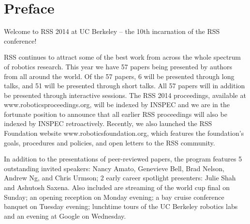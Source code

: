 
\chapter*{Preface}


                                                                     
                                             
\vspace{1cm}
\begingroup{}
\Large

Welcome to RSS 2014 at UC Berkeley – the 10th incarnation of the RSS conference! 

\vspace{1mm}

RSS continues to attract some of the best work from across the whole spectrum of robotics research. This year we have 57 papers being presented by authors from all around the world. Of the 57 papers, 6 will be presented through long talks, and 51 will be presented through short talks.  All 57 papers will in addition be presented through interactive sessions. The RSS 2014 proceedings, available at www.roboticsproceedings.org, will be indexed by INSPEC and we are in the fortunate position to announce that all earlier RSS proceedings will also be indexed by INSPEC retroactively. Recently, we also launched the RSS Foundation website www.roboticsfoundation.org, which features the foundation’s goals, procedures and policies, and open letters to the RSS community.

\vspace{1mm}

In addition to the presentations of peer-reviewed papers, the program features 5 outstanding invited speakers: Nancy Amato, Genevieve Bell, Brad Nelson, Andrew Ng, and Chris Urmson; 2 early career spotlight presenters: Julie Shah and Ashutosh Saxena. Also included are streaming of the world cup final on Sunday; an opening reception on Monday evening; a bay cruise conference banquet on Tuesday evening; lunchtime tours of the UC Berkeley robotics labs and an evening at Google on Wednesday.

\vspace{1mm}

